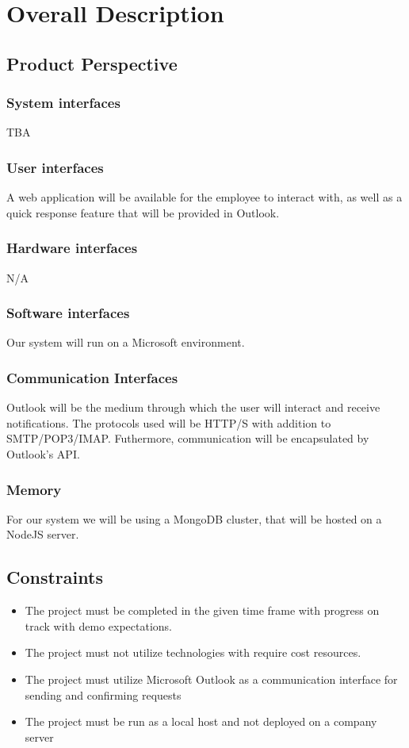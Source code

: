 \documentclass[a4paper,12pt]{article}
\begin{document}
\section{Overall Description}
\subsection{Product Perspective}
\subsubsection{System interfaces}
TBA
\subsubsection{User interfaces}
A web application will be available for the employee to interact with, as well as a quick response feature that will be provided in Outlook.
\subsubsection{Hardware interfaces}
N/A
\subsubsection{Software interfaces}
Our system will run on a Microsoft environment. 
\subsubsection{Communication Interfaces}
Outlook will be the medium through which the user will interact and receive notifications. The protocols used will be HTTP/S with addition to SMTP/POP3/IMAP. Futhermore, communication will be encapsulated by Outlook's API.
\subsubsection{Memory}
For our system we will be using a MongoDB cluster, that will be hosted on a NodeJS server.

\newpage
\subsection{Constraints}
	\begin{itemize}
		\item The project must be completed in the given time frame with progress on        track with demo expectations.
		\item The project must not utilize technologies with require cost resources.
		\item The project must utilize Microsoft Outlook as a communication interface       for sending and confirming requests
		\item The project must be run as a local host and not deployed on a company         server
	\end{itemize}
\end{document}
